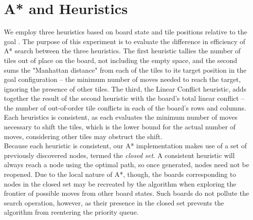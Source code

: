 
\section{A* and Heuristics}
\label{sec:background}

We employ three heuristics based on board state and tile positions relative to the goal \cite{aima}.  The purpose of this experiment is to evaluate the difference in efficiency of A* search between the three heuristics.  The first heuristic tallies the number of tiles out of place on the board, not including the empty space, and the second sums the "Manhattan distance" from each of the tiles to its target position in the goal configuration -- the minimum number of moves needed to reach the target, ignoring the presence of other tiles.  The third, the Linear Conflict heuristic, adds together the result of the second heuristic with the board's total linear conflict -- the number of out-of-order tile conflicts in each of the board's rows and columns.  Each heuristics is consistent, as each evaluates the minimum number of moves necessary to shift the tiles, which is the lower bound for the actual number of moves, considering other tiles may obstruct the shift. \\

Because each heuristic is consistent, our A* implementation makes use of a set of previously discovered nodes, termed the \emph{closed set}.  A consistent heuristic will always reach a node using the optimal path, so once generated, nodes need not be reopened.  Due to the local nature of A*, though, the boards corresponding to nodes in the closed set may be recreated by the algorithm when exploring the frontier of possible moves from other board states.  Such boards do not pollute the search operation, however, as their presence in the closed set prevents the algorithm from reentering the priority queue.